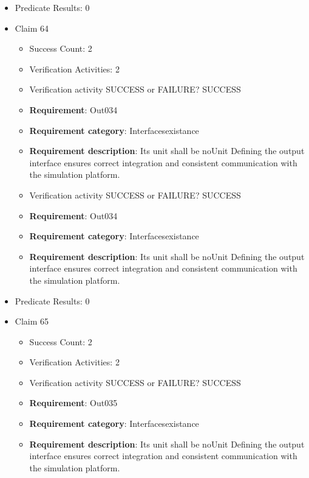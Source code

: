 \documentclass{article}
\begin{document}
\begin{itemize}
\begin{itemize}
				\end{itemize}
				
									    
				\item Predicate Results: 0

  				  \item Claim 64
				\begin{itemize}
			    	\item Success Count: 2 
			    	\item Verification Activities: 2
					\item Verification activity SUCCESS or FAILURE? SUCCESS
		
						\item \textbf{Requirement}: Out034 
						\item \textbf{Requirement category}: Interfacesexistance 
						\item \textbf{Requirement description}: Its unit shall be noUnit Defining the output interface ensures correct integration and consistent communication with the simulation platform.
					
					\item Verification activity SUCCESS or FAILURE? SUCCESS
		
						\item \textbf{Requirement}: Out034 
						\item \textbf{Requirement category}: Interfacesexistance 
						\item \textbf{Requirement description}: Its unit shall be noUnit Defining the output interface ensures correct integration and consistent communication with the simulation platform.
					
				\end{itemize}
				
									    
				\item Predicate Results: 0

  				  \item Claim 65
				\begin{itemize}
			    	\item Success Count: 2 
			    	\item Verification Activities: 2
					\item Verification activity SUCCESS or FAILURE? SUCCESS
		
						\item \textbf{Requirement}: Out035 
						\item \textbf{Requirement category}: Interfacesexistance 
						\item \textbf{Requirement description}: Its unit shall be noUnit Defining the output interface ensures correct integration and consistent communication with the simulation platform.
					

\end{itemize}
\end{itemize}
\end{document}
